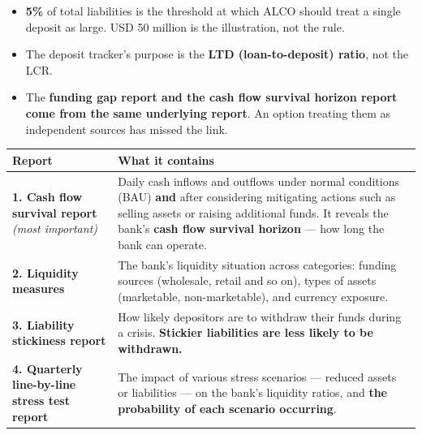 \begin{lrtrapbox}
\begin{itemize}
\item \textbf{5\%} of total liabilities is the threshold at which ALCO should treat a single deposit as large. USD 50 million is the illustration, not the rule.
\item The deposit tracker's purpose is the \textbf{LTD (loan-to-deposit) ratio}, not the LCR.
\item The \textbf{funding gap report and the cash flow survival horizon report come from the same underlying report}. An option treating them as independent sources has missed the link.
\end{itemize}
\end{lrtrapbox}


\begin{center}
\small
\begin{tabularx}{\textwidth}{@{}p{4.3cm} X@{}}
\toprule
\rowcolor{FRMSoft}\textbf{Report} & \textbf{What it contains} \\
\midrule
\textbf{1. Cash flow survival report} \newline \emph{(most important)} &
Daily cash inflows and outflows under normal conditions (BAU) \textbf{and} after considering mitigating actions such as selling assets or raising additional funds. It reveals the bank's \textbf{cash flow survival horizon} --- how long the bank can operate. \\
\addlinespace
\textbf{2. Liquidity measures} &
The bank's liquidity situation across categories: funding sources (wholesale, retail and so on), types of assets (marketable, non-marketable), and currency exposure. \\
\addlinespace
\textbf{3. Liability stickiness report} &
How likely depositors are to withdraw their funds during a crisis. \textbf{Stickier liabilities are less likely to be withdrawn.} \\
\addlinespace
\textbf{4. Quarterly line-by-line stress test report} &
The impact of various stress scenarios --- reduced assets or liabilities --- on the bank's liquidity ratios, and \textbf{the probability of each scenario occurring}. \\
\bottomrule
\end{tabularx}
\end{center}

